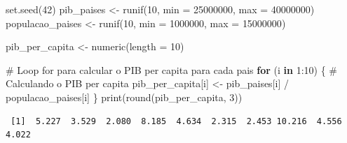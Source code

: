 \documentclass[
  portuguese,
  letterpaper,
  DIV=11,
  numbers=noendperiod]{scrreprt}
\newenvironment{Shaded}{\begin{snugshade}}{\end{snugshade}}
\newcommand{\AttributeTok}[1]{\textcolor[rgb]{0.40,0.45,0.13}{#1}}
\newcommand{\CommentTok}[1]{\textcolor[rgb]{0.37,0.37,0.37}{#1}}
\newcommand{\ControlFlowTok}[1]{\textcolor[rgb]{0.00,0.23,0.31}{\textbf{#1}}}
\newcommand{\DecValTok}[1]{\textcolor[rgb]{0.68,0.00,0.00}{#1}}
\newcommand{\FunctionTok}[1]{\textcolor[rgb]{0.28,0.35,0.67}{#1}}
\newcommand{\NormalTok}[1]{\textcolor[rgb]{0.00,0.23,0.31}{#1}}
\newcommand{\OtherTok}[1]{\textcolor[rgb]{0.00,0.23,0.31}{#1}}
\newcommand{\SpecialCharTok}[1]{\textcolor[rgb]{0.37,0.37,0.37}{#1}}
\theoremstyle{definition}
\theoremstyle{remark}
\begin{document}
\begin{Shaded}
\begin{Highlighting}[]
\FunctionTok{set.seed}\NormalTok{(}\DecValTok{42}\NormalTok{)}
\NormalTok{pib\_paises }\OtherTok{\textless{}{-}} \FunctionTok{runif}\NormalTok{(}\DecValTok{10}\NormalTok{, }\AttributeTok{min =} \DecValTok{25000000}\NormalTok{, }\AttributeTok{max =} \DecValTok{40000000}\NormalTok{)}
\NormalTok{populacao\_paises }\OtherTok{\textless{}{-}} \FunctionTok{runif}\NormalTok{(}\DecValTok{10}\NormalTok{, }\AttributeTok{min =} \DecValTok{1000000}\NormalTok{, }\AttributeTok{max =} \DecValTok{15000000}\NormalTok{)}

\NormalTok{pib\_per\_capita }\OtherTok{\textless{}{-}} \FunctionTok{numeric}\NormalTok{(}\AttributeTok{length =} \DecValTok{10}\NormalTok{)}

\CommentTok{\# Loop for para calcular o PIB per capita para cada pais}
\ControlFlowTok{for}\NormalTok{ (i }\ControlFlowTok{in} \DecValTok{1}\SpecialCharTok{:}\DecValTok{10}\NormalTok{) \{}
  \CommentTok{\# Calculando o PIB per capita}
\NormalTok{  pib\_per\_capita[i] }\OtherTok{\textless{}{-}}\NormalTok{ pib\_paises[i] }\SpecialCharTok{/}\NormalTok{ populacao\_paises[i]}
\NormalTok{\}}
\FunctionTok{print}\NormalTok{(}\FunctionTok{round}\NormalTok{(pib\_per\_capita, }\DecValTok{3}\NormalTok{))}
\end{Highlighting}
\end{Shaded}

\begin{verbatim}
 [1]  5.227  3.529  2.080  8.185  4.634  2.315  2.453 10.216  4.556  4.022
\end{verbatim}
\end{document}
